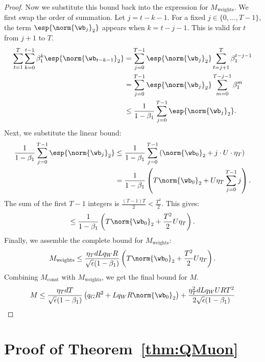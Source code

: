 \documentclass[11pt, letterpaper]{article}
\begin{document}
\begin{proof}
Now we substitute this bound back into the expression for $M_{\text{weights}}$. We first swap the order of summation. Let $j = t-k-1$. For a fixed $j \in \{0, \dots, T-1\}$, the term $\esp{\norm{\wb_j}_2}$ appears when $k=t-j-1$. This is valid for $t$ from $j+1$ to $T$.
\begin{align*}
    \sum_{t=1}^T \sum_{k=0}^{t-1} \beta_1^k \esp{\norm{\wb_{t-k-1}}_2} &= \sum_{j=0}^{T-1} \esp{\norm{\wb_j}_2} \sum_{t=j+1}^{T} \beta_1^{t-j-1} \\
    &= \sum_{j=0}^{T-1} \esp{\norm{\wb_j}_2} \sum_{m=0}^{T-j-1} \beta_1^{m} \\
    &\le  \frac{1}{1-\beta_1} \sum_{j=0}^{T-1} \esp{\norm{\wb_j}_2}.
\end{align*}
Next, we substitute the linear bound:
\begin{align*}
    \frac{1}{1-\beta_1} \sum_{j=0}^{T-1} \esp{\norm{\wb_j}_2} &\le \frac{1}{1-\beta_1} \sum_{j=0}^{T-1} \left( \norm{\wb_0}_2 + j \cdot U \cdot \eta_T \right) \\
    &= \frac{1}{1-\beta_1} \left( T\norm{\wb_0}_2 + U \eta_T \sum_{j=0}^{T-1} j \right).
\end{align*}
The sum of the first $T-1$ integers is $\frac{(T-1)T}{2} < \frac{T^2}{2}$. This gives:
\begin{equation*}
    \le \frac{1}{1-\beta_1} \left( T\norm{\wb_0}_2 + \frac{T^2}{2} U \eta_T \right).
\end{equation*}
Finally, we assemble the complete bound for $M_{\text{weights}}$:
\begin{equation*}
    M_{\text{weights}} \le \frac{\eta_T d L q_W R}{\sqrt{\epsilon}(1-\beta_1)} \left( T\norm{\wb_0}_2 + \frac{T^2}{2} U \eta_T \right).
\end{equation*}
Combining $M_{\text{const}}$ with $M_{\text{weights}}$, we get the final bound for $M$.
\begin{align}
    \label{eq:M_bound_final_linear_full}
    M &\le \frac{\eta_T d T}{\sqrt{\epsilon}(1-\beta_1)} \left( q_G R^2 + L q_W R \norm{\wb_0}_2 \right) + \frac{\eta_T^2 d L q_W UR T^2}{2\sqrt{\epsilon}(1-\beta_1)} \nonumber \\
\end{align}
\end{proof}





\section{Proof of Theorem~\ref{thm:QMuon}}\label{app:Proof_QMuon}
\end{document}
